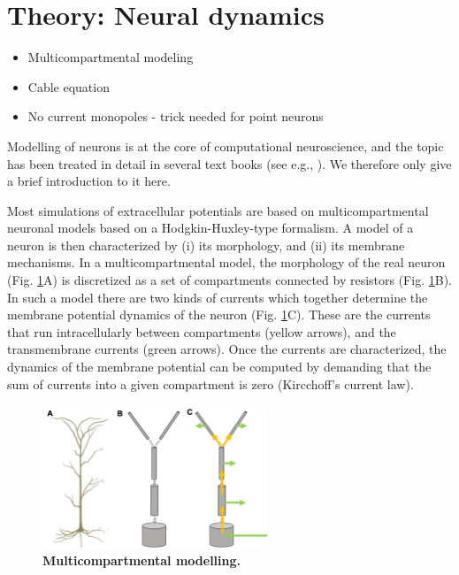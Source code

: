 \section{Theory: Neural dynamics}
\label{sec:NeuralDynamics}
\begin{itemize}
\item Multicompartmental modeling
\item Cable equation
\item No current monopoles - trick needed for point neurons
\end{itemize}

Modelling of neurons is at the core of computational neuroscience, and the topic has been treated in detail in several text books (see e.g., \cite{KockSegev1998, Koch1999, Hille2001, Dayan2005, Sterratt2011}). We therefore only give a brief introduction to it here. 

Most simulations of extracellular potentials are based on multicompartmental neuronal models based on a Hodgkin-Huxley-type formalism. A model of a neuron is then characterized by (i) its morphology, and (ii) its membrane mechanisms. In a multicompartmental model, the morphology of the real neuron (Fig. \ref{fig:multicomp}A) is discretized as a set of compartments connected by resistors (Fig. \ref{fig:multicomp}B). In such a model there are two kinds of currents which together determine the membrane potential dynamics of the neuron (Fig. \ref{fig:multicomp}C). These are the currents that run intracellularly between compartments (yellow arrows), and the transmembrane currents (green arrows). Once the currents are characterized, the dynamics of the membrane potential can be computed by demanding that the sum of currents into a given compartment is zero (Kircchoff's current law). 

\begin{figure}[!ht]
\begin{center}
\includegraphics[width=0.6\textwidth]{Fig02/Multicomp.png}
\end{center}
\caption{\textbf{Multicompartmental modelling.} 
}
\label{fig:multicomp}
\end{figure}

